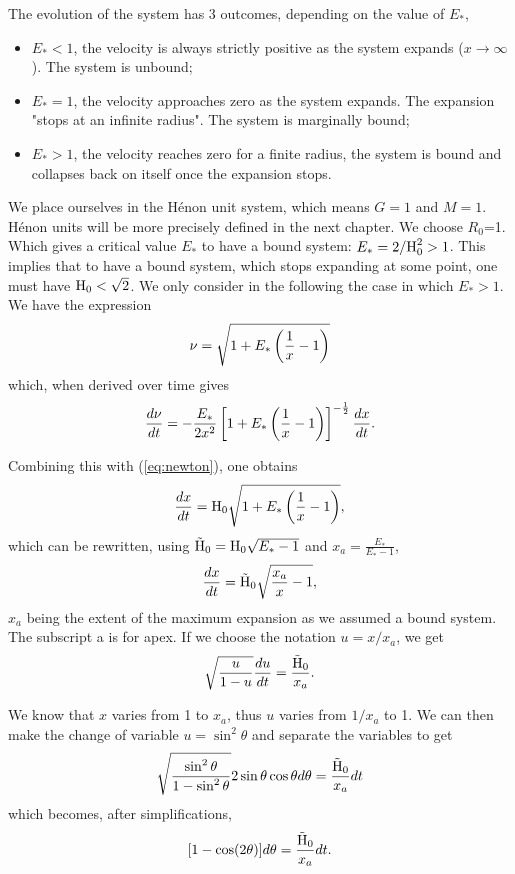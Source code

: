 The evolution of the system has 3 outcomes, depending on the value of $E_\ast$,
\begin{itemize}
\item $E_\ast<1$, the velocity is always strictly positive as the system expands ($x\rightarrow\infty$). The system is unbound;
\item $E_\ast=1$, the velocity approaches zero as the system expands. The expansion "stops at an infinite radius". The system is marginally bound;
\item $E_\ast>1$, the velocity reaches zero for a finite radius, the system is bound and collapses back on itself once the expansion stops. 
\end{itemize}

We place ourselves in the H\'enon unit system, which means $G=1$ and $M=1$. H\'enon units will be more precisely defined in the next chapter. We choose $R_0$=1. Which gives a critical value $E_*$ to have a bound system: $E_* = 2 /{\textrm{H}}^2_0 > 1$. This implies that to have a bound system, which stops expanding at some point, one must have ${\textrm{H}}_0 < \sqrt{2}$.
We only consider in the following the case in which $E_\ast>1$. We have the expression
\begin{equation}
\nu = \sqrt{1+E_\ast\left(\frac{1}{x} - 1\right)}
\end{equation}
which, when derived over time gives
\begin{equation}
\frac{d \nu}{dt} = - \frac{E_\ast}{2 x^2} \left[ 1 + E_\ast\left(\frac{1}{x} -1\right)\right]^{-\frac{1}{2}} \frac{dx}{dt}.
\end{equation}

Combining this with (\ref{eq:newton}), one obtains
\begin{equation}
\frac{dx}{dt} = {\textrm{H}}_0 \sqrt{1+ E_\ast\left( \frac{1}{x} -1\right)},
\end{equation}
which can be rewritten, using $\tilde{{\textrm{H}}}_0 = {\textrm{H}}_0 \sqrt{E_\ast-1}$ and $x_a=\frac{E_\ast}{E_\ast-1}$,
\begin{equation}
\frac{dx}{dt} = \tilde{{\textrm{H}}}_0 \sqrt{\frac{x_a}{x}-1},
\end{equation}
$x_a$ being the extent of the maximum expansion as we assumed a bound system. The subscript a is for apex. If we choose the notation $u = x/x_a$, we get
\begin{equation}
\sqrt{\frac{u}{1-u}} \frac{du}{dt} = \frac{\tilde{{\textrm{H}}}_0}{x_a}.
\end{equation}

We know that $x$ varies from 1 to $x_a$, thus $u$ varies from $1/x_a$ to 1. We can then make the change of variable $u = \sin^2\theta$ and separate the variables to get
\begin{equation}
\sqrt{\frac{\sin^2\theta}{1-\sin^2\theta}} 2 \sin\theta \cos\theta d \theta = \frac{\tilde{{\textrm{H}}}_0}{x_a} dt
\end{equation}
which becomes, after simplifications,
\begin{equation}
\label{Eq:1_integrand_theta}
[ 1 - \cos(2\theta)]d\theta = \frac{\tilde{{\textrm{H}}}_0}{x_a} dt .
\end{equation}


